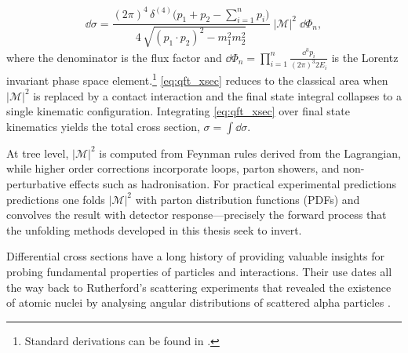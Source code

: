     \begin{equation}
      \dd\sigma =
      \frac{(2\pi)^4 \, \delta^{(4)}\!\bigl(p_1 + p_2 - \sum_{i=1}^n p_i\bigr)}
           {4\,\sqrt{(p_1\!\cdot\!p_2)^2 - m_1^2 m_2^2}}
      \; |\mathcal{M}|^2 \;
      \dd\Phi_n,
      \label{eq:qft_xsec}
    \end{equation}
    where the denominator is the flux factor and \(\dd\Phi_n = \prod_{i=1}^{n} \tfrac{\dd^3 p_i}{(2\pi)^3 2E_i}\) is the Lorentz invariant phase space element.\footnote{Standard derivations can be found in \cite{peskin_introduction_1995,Navas2024ReviewPhysics, Hollik2014Quantum978-1-107-03473-0, QuantumAssessment}.
    }
    \cref{eq:qft_xsec} reduces to the classical area when \(|\mathcal{M}|^2\) is replaced by a contact interaction and the final state integral collapses to a single kinematic configuration.
    Integrating \cref{eq:qft_xsec} over final state kinematics yields the total cross section, \(\sigma = \int \dd\sigma\).
    
    At tree level, \(|\mathcal{M}|^2\) is computed from Feynman rules derived from the Lagrangian, while higher order corrections incorporate loops, parton showers, and non-perturbative effects such as hadronisation.
    For practical experimental predictions predictions one folds \(|\mathcal{M}|^2\) with parton distribution functions (PDFs) and convolves the result with detector response---precisely the forward process that the unfolding methods developed in this thesis seek to invert.

Differential cross sections have a long history of providing valuable insights for probing fundamental properties of particles and interactions.
%
Their use dates all the way back to Rutherford's scattering experiments that revealed the existence of atomic nuclei by analysing angular distributions of scattered alpha particles \cite{F.R.S.1911LXXIX.Atom}.

